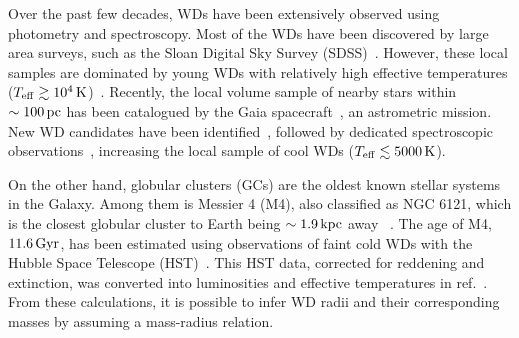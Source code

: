 Over the past few decades, WDs have been extensively observed using photometry and spectroscopy. Most of the WDs have been discovered by large area surveys, such as the Sloan Digital Sky Survey (SDSS)~\cite{SDSS:2000hjo_Sloandigitalsky}. However, these local samples are dominated by young WDs with relatively high effective temperatures ($T_{\rm eff}\gtrsim10^4{\rm \,K}$)~\cite{SDSS:2006iiz_Catalogspectroscopicallyconfirmed,Kleinman:2012nt_jan_SDSSDR7white,Tremblay_sep_Fieldwhitedwarf,Kepler_mar_Whitedwarfmass,Kepler_jun_Whitedwarfsubdwarf}. 
Recently, the local volume sample of nearby stars within $\sim100{\rm \,pc}$ has been catalogued by the Gaia spacecraft~\cite{Gaia:2018vmj_aug_Gaiadatarelease,Gaia:2020wqu_may_Gaiaearlydata}, an astrometric mission. New WD candidates have been identified~\cite{GentileFusillo_feb_GaiaDataRelease}, followed by dedicated spectroscopic observations~\cite{Tremblay_jul_Gaiawhitedwarfs,McCleery_jul_Gaiawhitedwarfs}, increasing the local sample of cool WDs ($T_{\rm eff}\lesssim5000{\rm \,K}$). 

On the other hand, globular clusters (GCs) are the oldest known stellar systems in the Galaxy. Among them is Messier 4 (M4), also classified as NGC 6121, which is the closest globular cluster to Earth being $\sim 1.9{\rm \,kpc}$ away ~\cite{Neeley_jul_Distanceglobularcluster,Watkins_apr_Tychogaiaastrometricsolution,Shao_nov_GaiaparallaxMilky}. 
The age of M4, $11.6{\rm \,Gyr}$, has been estimated using observations of faint cold WDs with the Hubble Space Telescope  (HST)~\cite{Hansen:2004ih_HSTobservationswhite,Bedin:2009it_jun_Endwhitedwarf}. 
This HST data, corrected for reddening and extinction, 
was converted into luminosities and effective temperatures in ref.~\cite{McCullough:2010ai_CaptureInelasticDark}. From these calculations, it is possible to infer WD radii and their corresponding masses by assuming a mass-radius relation. 

